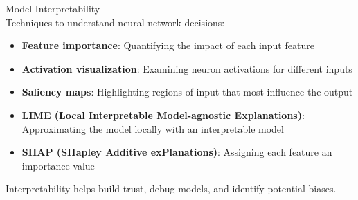 \begin{concept}{Model Interpretability}\\
Techniques to understand neural network decisions:
\begin{itemize}
    \item \textbf{Feature importance}: Quantifying the impact of each input feature
    \item \textbf{Activation visualization}: Examining neuron activations for different inputs
    \item \textbf{Saliency maps}: Highlighting regions of input that most influence the output
    \item \textbf{LIME (Local Interpretable Model-agnostic Explanations)}: Approximating the model locally with an interpretable model
    \item \textbf{SHAP (SHapley Additive exPlanations)}: Assigning each feature an importance value
\end{itemize}
Interpretability helps build trust, debug models, and identify potential biases.
\end{concept}

